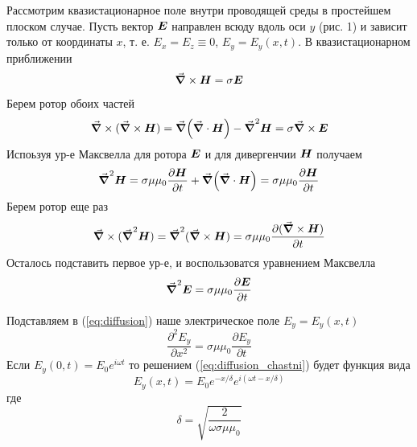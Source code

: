 \documentclass[a4paper,12pt]{article}
\begin{document}
Рассмотрим квазистационарное поле внутри проводящей среды в простейшем плоском случае.
Пусть вектор $\vb*{E}$ направлен всюду вдоль оси $y$ (рис. 1) 
и зависит только от координаты $x$, т. е. ${E_x} = {E_z} \equiv 0$, $E_y=E_y(x,t)$.
В квазистационарном приближении 
\begin{equation*}
    \grad \times \vb*{H} = \sigma \vb*{E}
\end{equation*}
Берем ротор обоих частей
\begin{equation*}
    \grad \times (\grad \times \vb*{H}) = \grad(\grad \cdot \vb*{H}) - \grad^2\vb*{H} = \sigma \grad \times \vb*{E}
\end{equation*}
Испоьзуя ур-е Максвелла для ротора $\vb*{E}$ и для дивергенчии $\vb*{H}$ получаем
\begin{equation}
    \grad^2 \vb*{H} = \sigma\mu\mu_0\frac{\partial\vb*{H}}{\partial t} 
                      + \grad(\grad \cdot \vb*{H}) = \sigma\mu\mu_0\frac{\partial\vb*{H}}{\partial t} 
    \label{eq:laplacian_H}
\end{equation}
Берем ротор еще раз
\begin{equation*}
    \grad \times (\grad^2\vb*{H}) = \grad^2 (\grad \times \vb*{H}) =
    \sigma\mu\mu_0 \frac{\partial (\grad \times \vb*{H})}{\partial t}
\end{equation*}
Осталось подставить первое ур-е, и воспользоватся уравнением Максвелла
\begin{equation}
    \grad^2\vb*{E}=\sigma\mu\mu_0 \frac{\partial \vb*{E}}{\partial t}\label{eq:diffusion}
\end{equation}

Подставляем в (\ref{eq:diffusion}) наше электрическое поле $E_y=E_y(x,t)$
\begin{equation}
    \frac{\partial^2 E_y}{\partial x^2} = \sigma\mu\mu_0\frac{\partial E_y}{\partial t}
    \label{eq:diffusion_chastni}
\end{equation}
Если $E_y(0,t)=E_0 e^{i\omega t}$ то решением (\ref{eq:diffusion_chastni}) будет функция вида
\begin{equation}
    E_y(x,t)=E_0 e^{-x/\delta} e^{i(\omega t - x/\delta)}
    \label{eq:skin_effect_poluprostranstvo}
\end{equation}
где
\begin{equation}
    \delta = \sqrt{\frac{2}{\omega\sigma\mu\mu_0}}
    \label{eq:delta}
\end{equation}

\newpage
\end{document}
